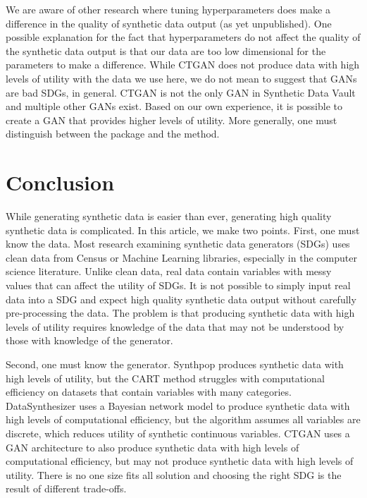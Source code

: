 \documentclass[runningheads]{llncs}
\begin{document}
We are aware of other research where tuning hyperparameters does make a difference in the quality of synthetic data output (as yet unpublished).  One possible explanation for the fact that hyperparameters do not affect the quality of the synthetic data output is that our data are too low dimensional for the parameters to make a difference.  While CTGAN does not produce data with high levels of utility with the data we use here, we do not mean to suggest that GANs are bad SDGs, in general.  CTGAN is not the only GAN in Synthetic Data Vault and multiple other GANs exist. Based on our own experience, it is possible to create a GAN that provides higher levels of utility.  More generally, one must distinguish between the package and the method.  

\section{Conclusion}\label{sec:conclusion}

While generating synthetic data is easier than ever, generating high quality synthetic data is complicated.  In this article, we make two points.  First, one must know the data.  Most research examining synthetic data generators (SDGs) uses clean data from Census or Machine Learning libraries, especially in the computer science literature.  Unlike clean data, real data contain variables with messy values that can affect the utility of SDGs.  It is not possible to simply input real data into a SDG and expect high quality synthetic data output without carefully pre-processing the data.  The problem is that producing synthetic data with high levels of utility requires knowledge of the data that may not be understood by those with knowledge of the generator.

Second, one must know the generator.  Synthpop produces synthetic data with high levels of utility, but the CART method struggles with computational efficiency on datasets that contain variables with many categories.  DataSynthesizer uses a Bayesian network model to produce synthetic data with high levels of computational efficiency, but the algorithm assumes all variables are discrete, which reduces utility of synthetic continuous variables.  CTGAN uses a GAN architecture to also produce synthetic data with high levels of computational efficiency, but may not produce synthetic data with high levels of utility.  There is no one size fits all solution and choosing the right SDG is the result of different trade-offs.  
\end{document}
